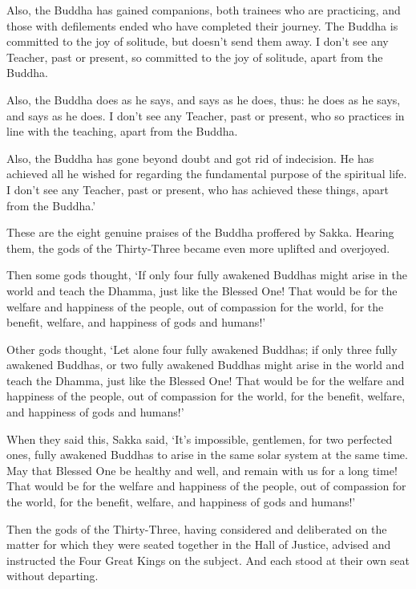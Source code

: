 \documentclass[12pt,openany]{book}%
\begin{document}
Also, the Buddha has gained companions, both trainees who are practicing, and those with defilements ended who have completed their journey. The Buddha is committed to the joy of solitude, but doesn’t send them away. I don’t see any Teacher, past or present, so committed to the joy of solitude, apart from the Buddha. 

Also, the Buddha does as he says, and says as he does, thus: he does as he says, and says as he does. I don’t see any Teacher, past or present, who so practices in line with the teaching, apart from the Buddha. 

Also, the Buddha has gone beyond doubt and got rid of indecision. He has achieved all he wished for regarding the fundamental purpose of the spiritual life. I don’t see any Teacher, past or present, who has achieved these things, apart from the Buddha.’ 

These are the eight genuine praises of the Buddha proffered by Sakka. Hearing them, the gods of the Thirty-Three became even more uplifted and overjoyed. 

Then some gods thought, ‘If only four fully awakened Buddhas might arise in the world and teach the Dhamma, just like the Blessed One! That would be for the welfare and happiness of the people, out of compassion for the world, for the benefit, welfare, and happiness of gods and humans!’ 

Other gods thought, ‘Let alone four fully awakened Buddhas; if only three fully awakened Buddhas, or two fully awakened Buddhas might arise in the world and teach the Dhamma, just like the Blessed One! That would be for the welfare and happiness of the people, out of compassion for the world, for the benefit, welfare, and happiness of gods and humans!’ 

When they said this, Sakka said, ‘It’s impossible, gentlemen, for two perfected ones, fully awakened Buddhas to arise in the same solar system at the same time. May that Blessed One be healthy and well, and remain with us for a long time! That would be for the welfare and happiness of the people, out of compassion for the world, for the benefit, welfare, and happiness of gods and humans!’ 

Then the gods of the Thirty-Three, having considered and deliberated on the matter for which they were seated together in the Hall of Justice, advised and instructed the Four Great Kings on the subject. And each stood at their own seat without departing. 
\end{document}

